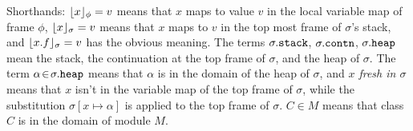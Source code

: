 Shorthands: 
 $\lfloor x \rfloor_{\phi} = v$  means that $x$ maps to
value $v$ in the local variable map of frame $\phi$, $\lfloor x \rfloor_{\sigma} = v$ means that $x$ 
maps to $v$ in the top most frame of $\sigma$'s stack, and $\lfloor x.f \rfloor_{\sigma} = v$
has the obvious meaning. The terms $\sigma.{\texttt{stack}}$,  
$\sigma.{\texttt{contn}}$, 
$\sigma.{\texttt{heap}}$     mean the stack, 
the continuation at the
top frame of $\sigma$, %
and the heap of $\sigma$.
The term $\alpha\!\in\!\sigma.{\texttt{heap}}$ means that $\alpha$ is in the domain of the heap of $\sigma$, and \emph{$x$ fresh in $\sigma$} means that 
$x$ isn't in the variable map of the top frame of $\sigma$, 
while the substitution  $\sigma[x \mapsto \alpha]$ is applied to the top frame of $\sigma$.
$C\in M$ means that class $C$ is in the domain of module $M$. 

